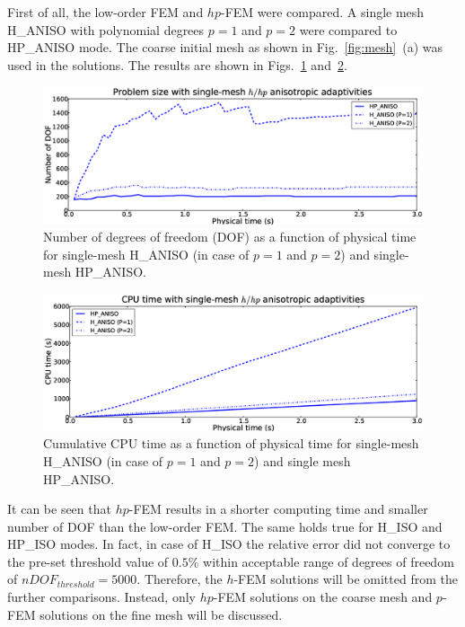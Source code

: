 First of all, the low-order FEM and $hp$-FEM were compared. A single mesh
H\_ANISO with polynomial degrees $p=1$ and $p=2$ were compared to
HP\_ANISO mode. The coarse initial mesh as shown in Fig.~\ref{fig:mesh}~(a)
was used in the solutions.
The results are shown in Figs.~\ref{fig:singlehhpdof} 
and~\ref{fig:singlehhpcpu}.
\begin{figure}[!ht]
  \begin{centering}
  \includegraphics[width=\columnwidth]{singleh_hp_dof}
  \caption{\label{fig:singlehhpdof} Number of degrees of freedom (DOF) as a function 
  of physical time for single-mesh H\_ANISO (in case of
  $p=1$ and $p=2$) and single-mesh HP\_ANISO.}
  \end{centering}
\end{figure}


\begin{figure}[!ht]
  \begin{centering}
  \includegraphics[width=\columnwidth]{singleh_hp_cpu}
  \caption{\label{fig:singlehhpcpu} Cumulative CPU time as a function 
  of physical time for single-mesh H\_ANISO (in case of $p=1$ and $p=2$)
  and single mesh HP\_ANISO.}
  \end{centering}
\end{figure}

\noindent
It can be seen that $hp$-FEM results in a shorter computing 
time and smaller number
of DOF than the low-order FEM. The same holds true
for H\_ISO and HP\_ISO modes. In fact, in case of H\_ISO the relative error did not
converge to the pre-set threshold value of $0.5\%$ within acceptable range 
of degrees of freedom of $nDOF_{threshold}=5000$.
Therefore, the $h$-FEM solutions will be omitted from the further comparisons.
Instead, only $hp$-FEM solutions on the coarse mesh and $p$-FEM solutions
on the fine mesh will be discussed.

